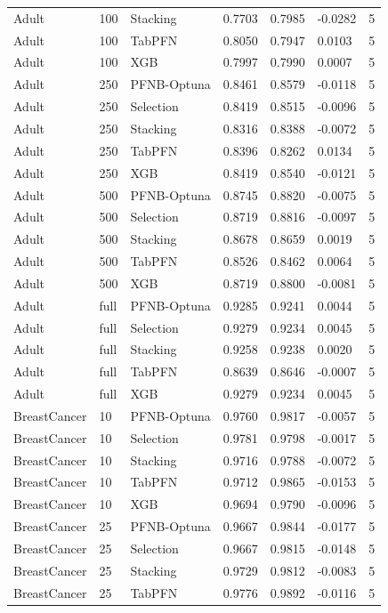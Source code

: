 \begin{tabular}{llllllr}
Adult & 100 & Stacking & 0.7703 & 0.7985 & -0.0282 & 5 \\
Adult & 100 & TabPFN & 0.8050 & 0.7947 & 0.0103 & 5 \\
Adult & 100 & XGB & 0.7997 & 0.7990 & 0.0007 & 5 \\
Adult & 250 & PFNB-Optuna & 0.8461 & 0.8579 & -0.0118 & 5 \\
Adult & 250 & Selection & 0.8419 & 0.8515 & -0.0096 & 5 \\
Adult & 250 & Stacking & 0.8316 & 0.8388 & -0.0072 & 5 \\
Adult & 250 & TabPFN & 0.8396 & 0.8262 & 0.0134 & 5 \\
Adult & 250 & XGB & 0.8419 & 0.8540 & -0.0121 & 5 \\
Adult & 500 & PFNB-Optuna & 0.8745 & 0.8820 & -0.0075 & 5 \\
Adult & 500 & Selection & 0.8719 & 0.8816 & -0.0097 & 5 \\
Adult & 500 & Stacking & 0.8678 & 0.8659 & 0.0019 & 5 \\
Adult & 500 & TabPFN & 0.8526 & 0.8462 & 0.0064 & 5 \\
Adult & 500 & XGB & 0.8719 & 0.8800 & -0.0081 & 5 \\
Adult & full & PFNB-Optuna & 0.9285 & 0.9241 & 0.0044 & 5 \\
Adult & full & Selection & 0.9279 & 0.9234 & 0.0045 & 5 \\
Adult & full & Stacking & 0.9258 & 0.9238 & 0.0020 & 5 \\
Adult & full & TabPFN & 0.8639 & 0.8646 & -0.0007 & 5 \\
Adult & full & XGB & 0.9279 & 0.9234 & 0.0045 & 5 \\
BreastCancer & 10 & PFNB-Optuna & 0.9760 & 0.9817 & -0.0057 & 5 \\
BreastCancer & 10 & Selection & 0.9781 & 0.9798 & -0.0017 & 5 \\
BreastCancer & 10 & Stacking & 0.9716 & 0.9788 & -0.0072 & 5 \\
BreastCancer & 10 & TabPFN & 0.9712 & 0.9865 & -0.0153 & 5 \\
BreastCancer & 10 & XGB & 0.9694 & 0.9790 & -0.0096 & 5 \\
BreastCancer & 25 & PFNB-Optuna & 0.9667 & 0.9844 & -0.0177 & 5 \\
BreastCancer & 25 & Selection & 0.9667 & 0.9815 & -0.0148 & 5 \\
BreastCancer & 25 & Stacking & 0.9729 & 0.9812 & -0.0083 & 5 \\
BreastCancer & 25 & TabPFN & 0.9776 & 0.9892 & -0.0116 & 5 \\

\end{tabular}
